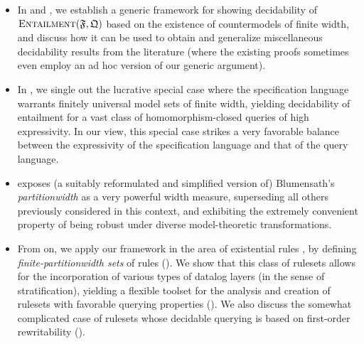 \documentclass[10pt,a4paper]{amsart}
\theoremstyle{definition}
\numberwithin{equation}{section}
\theoremstyle{plain}
\theoremstyle{definition}
\theoremstyle{myexample}
\theoremstyle{plain}
\theoremstyle{definition}
\begin{document}
\begin{itemize}
\item In  and , we establish a generic framework for showing decidability of $\textsc{Entailment}(\mathfrak{F},\mathfrak{Q})$ based on the existence of countermodels of finite width, and discuss how it can be used to obtain and generalize miscellaneous decidability results from the literature (where the existing proofs sometimes even employ an ad hoc version of our generic argument).   

\item In , we single out the lucrative special case where the specification language warrants finitely universal model sets of finite width, yielding decidability of entailment for a vast class of homomorphism-closed queries of high expressivity. In our view, this special case strikes a very favorable balance between the expressivity of the specification language and that of the query language. 

\item {} exposes (a suitably reformulated and simplified version of) Blumensath's \emph{partitionwidth} \cite{Blumensath03,Blumensath06} as a very powerful width measure, superseding all others previously considered in this context, and exhibiting the extremely convenient property of being robust under diverse model-theoretic transformations.

\item From  on, we apply our framework in the area of existential rules%
, by defining \emph{finite-partitionwidth sets} of rules (). We show that this class of rulesets allows for the incorporation of various types of datalog layers (in the sense of stratification), yielding a flexible toolset for the analysis and creation of rulesets with favorable querying properties (). We also discuss the somewhat complicated case of rulesets whose decidable querying is based on first-order rewritability ().    
\end{itemize}


\end{document}
